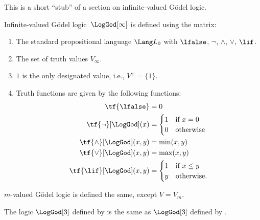 \documentclass[../../../include/open-logic-section]{subfiles}
\begin{document}


\begin{editorial}
  This is a short ``stub'' of a section on infinite-valued G\"odel logic.
\end{editorial}

\begin{defn} Infinite-valued G\"odel
logic~$\LogGod[\infty]$ is defined using the matrix:
\begin{enumerate}
  \item The standard propositional language $\Lang L_0$ with
  $\lfalse$, $\lnot$, $\land$, $\lor$, $\lif$.
  \item The set of truth values $V_\infty$.
  \item $1$ is the only designated value, i.e., $V^+ = \{1\}$.
  \item Truth functions are given by the following functions:
  \begin{align*}
    \tf{\lfalse} & = 0\\
    \tf{\lnot}[\LogGod](x) & = \begin{cases}
      $1$ & \text{if } x =0\\
      $0$ & \text{otherwise}
    \end{cases}\\
    \tf{\land}[\LogGod](x,y) & = \min(x,y)\\
    \tf{\lor}[\LogGod](x,y) & = \max(x,y)\\
    \tf{\lif}[\LogGod](x,y) & = \begin{cases}
      1 & \text{if } x \le y\\
      y & \text{otherwise.}
    \end{cases}
    \end{align*}
\end{enumerate}
$m$-valued G\"odel logic is defined the same, except $V = V_m$.
\end{defn}

\begin{prop}
  The logic $\LogGod[3]$ defined by 
  is the same as $\LogGod[3]$ defined by .
\end{prop}
\end{document}
